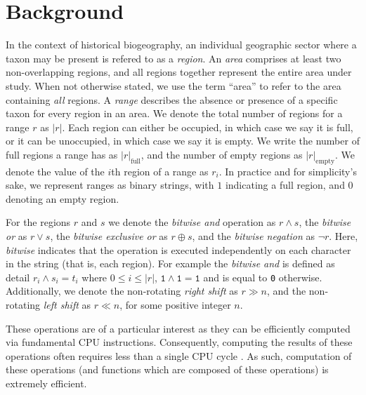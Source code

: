 \documentclass[a4paper]{article}
\newcommand{\CountFull}[1]{|#1|_\text{full}}
\newcommand{\CountEmpty}[1]{|#1|_\text{empty}}
\newcommand{\rand}[2]{#1 \land #2}
\newcommand{\ror}[2]{#1 \lor #2}
\newcommand{\rneg}[1]{\neg #1}
\newcommand{\rxor}[2]{#1 \oplus #2}
\newcommand{\rLshift}[2]{#1 \ll #2}
\newcommand{\rRshift}[2]{#1 \gg #2}
\begin{document}
\section{Background}

In the context of historical biogeography, an individual geographic sector where a taxon may be present is refered to as a \textit{region}.
An \textit{area} comprises at least two non-overlapping regions, and all regions together represent the entire area under study.
When not otherwise stated, we use the term ``area'' to refer to the area containing \textit{all} regions.
A \textit{range} describes the absence or presence of a specific taxon for every region in an area.
We denote the total number of regions for a range \( r \) as \( |r| \).
Each region can either be occupied, in which case we say it is full, or it can be unoccupied, in which case we say it is
empty.
We write the number of full regions a range has as \( \CountFull{r} \), and the number of empty regions as \(
\CountEmpty{r} \).
We denote the value of the $i$th region of a range as $r_i$.
In practice and for simplicity's sake, we represent ranges as binary strings, with $1$ indicating a full region, and $0$
denoting an empty region.

For the regions $r$ and $s$ we denote the \textit{bitwise and} operation as $\rand{r}{s}$, the \textit{bitwise or} as $\ror{r}{s}$,
the \textit{bitwise exclusive or} as $\rxor{r}{s}$, and the \textit{bitwise negation} as $\rneg{r}$.
Here, \textit{bitwise} indicates that the operation is executed independently on each character in the string (that is,
each region). 
For example the \textit{bitwise and} is defined as detail $r_i \land s_i = t_i$ where $0 \leq i \leq |r|$, $\texttt{1}
\land \texttt{1} = \texttt{1}$ and is equal to \texttt{0} otherwise.
Additionally, we denote the non-rotating \textit{right shift} as $\rRshift{r}{n}$, and the non-rotating \textit{left shift} as
$\rLshift{r}{n}$, for some positive integer $n$.

These operations are of a particular interest as they can be efficiently computed via fundamental CPU instructions.
Consequently, computing the results of these operations often requires less than a single CPU cycle\footnotemark
\citep{Abel19a}.
As such, computation of these operations (and functions which are composed of these operations) is extremely efficient.

\end{document}
